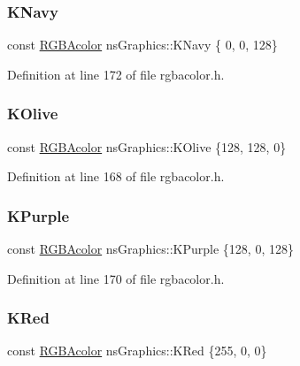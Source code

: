 \subsubsection{\texorpdfstring{K\+Navy}{KNavy}}
{\footnotesize\ttfamily const \hyperlink{classns_graphics_1_1_r_g_b_acolor}{R\+G\+B\+Acolor} ns\+Graphics\+::\+K\+Navy \{ 0, 0, 128\}}



Definition at line 172 of file rgbacolor.\+h.

\mbox{\label{namespacens_graphics_a11591ce1586e827d54a3d10b2fe3fc0c}} 
\subsubsection{\texorpdfstring{K\+Olive}{KOlive}}
{\footnotesize\ttfamily const \hyperlink{classns_graphics_1_1_r_g_b_acolor}{R\+G\+B\+Acolor} ns\+Graphics\+::\+K\+Olive \{128, 128, 0\}}



Definition at line 168 of file rgbacolor.\+h.

\mbox{\label{namespacens_graphics_a43b5e5d4f7a1bc5f2928a5a8e312773b}} 
\subsubsection{\texorpdfstring{K\+Purple}{KPurple}}
{\footnotesize\ttfamily const \hyperlink{classns_graphics_1_1_r_g_b_acolor}{R\+G\+B\+Acolor} ns\+Graphics\+::\+K\+Purple \{128, 0, 128\}}



Definition at line 170 of file rgbacolor.\+h.

\mbox{\label{namespacens_graphics_a2eb081113194e8ff44aebd697c2cfe61}} 
\subsubsection{\texorpdfstring{K\+Red}{KRed}}
{\footnotesize\ttfamily const \hyperlink{classns_graphics_1_1_r_g_b_acolor}{R\+G\+B\+Acolor} ns\+Graphics\+::\+K\+Red \{255, 0, 0\}}



